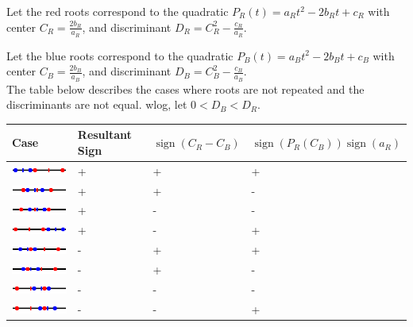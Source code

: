 \documentclass{article}
\DeclareMathOperator{\sign}{sign}
\begin{document}
\noindent
Let the red roots correspond to the quadratic
$P_R(t)=a_Rt^2-2b_Rt+c_R$ with center $C_R=\frac{2 b_R}{a_R}$,
and discriminant $D_R=C_R^2-\frac{c_R}{a_R}$.

\noindent
Let the blue roots correspond to the quadratic
$P_B(t)=a_Bt^2-2b_Bt+c_B$ with center $C_B=\frac{2 b_B}{a_B}$,
and discriminant $D_B=C_B^2-\frac{c_B}{a_B}$.\\

\noindent
The table below describes the cases where roots are not repeated and
the discriminants are not equal.  wlog, let $0 < D_B < D_R$.

\begin{tabular}{|l|ll|l|}
  \hline Case & Resultant Sign & $\sign(C_R-C_B)$ &
  $\sign(P_R(C_B))\sign(a_R)$\\ \hline
  \includegraphics[width=100pt]{imgs/root_orderings_case1.png} & + & +
  & + \\ \includegraphics[width=100pt]{imgs/root_orderings_case4.png}
  & + & + & -
  \\ \includegraphics[width=100pt]{imgs/root_orderings_case5.png} & +
  & - & -
  \\ \includegraphics[width=100pt]{imgs/root_orderings_case8.png} & +
  & - & +
  \\ \includegraphics[width=100pt]{imgs/root_orderings_case2.png} & -
  & + & +
  \\ \includegraphics[width=100pt]{imgs/root_orderings_case3.png} & -
  & + & -
  \\ \includegraphics[width=100pt]{imgs/root_orderings_case6.png} & -
  & - & -
  \\ \includegraphics[width=100pt]{imgs/root_orderings_case7.png} & -
  & - & + \\ \hline
\end{tabular}
\end{document}
